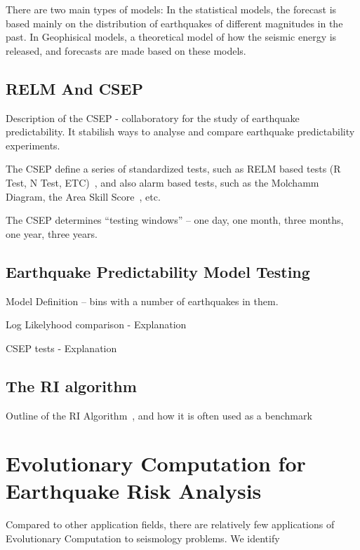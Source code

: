 \documentclass{sig-alternate}
\begin{document}
There are two main types of models: In the statistical models, the
forecast is based mainly on the distribution of earthquakes of
different magnitudes in the past. In Geophisical models, a theoretical
model of how the seismic energy is released, and forecasts are made
based on these models.


\subsection{RELM And CSEP}

Description of the CSEP - collaboratory for the study of earthquake
predictability.  It stabilish ways to analyse and compare earthquake
predictability experiments.

The CSEP define a series of standardized tests, such as RELM based
tests (R Test, N Test, ETC)~\cite{Schorlemmer2007}, and also alarm
based tests, such as the Molchamm Diagram, the Area Skill
Score~\cite{Zechar2010}, etc.

The CSEP determines ``testing windows'' -- one day, one month, three
months, one year, three years.

\subsection{Earthquake Predictability Model Testing}

Model Definition -- bins with a number of earthquakes in them.

Log Likelyhood comparison - Explanation

CSEP tests - Explanation

\subsection{The RI algorithm}

Outline of the RI Algorithm~\cite{Nanjo2011}, and how it is often used
as a benchmark


\section{Evolutionary Computation for Earthquake Risk Analysis}

Compared to other application fields, there are relatively few
applications of Evolutionary Computation to seismology problems.
We identify 
\end{document}
